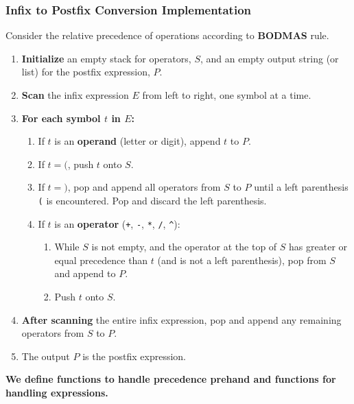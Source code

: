 
\subsubsection{Infix to Postfix Conversion Implementation}
Consider the relative precedence of operations according to \textbf{BODMAS}
rule. 

\begin{enumerate}
  \item \textbf{Initialize} an empty stack for operators, \( S \), and an empty output string (or list) for the postfix expression, \( P \).
  \item \textbf{Scan} the infix expression \( E \) from left to right, one symbol at a time.
  \item \textbf{For each symbol \( t \) in \( E \):}
    \begin{enumerate}[label=\alph*)]
      \item If \( t \) is an \textbf{operand} (letter or digit), append \( t \) to \( P \).
      \item If \( t = \texttt{(} \), push \( t \) onto \( S \).
      \item If \( t = \texttt{)} \), pop and append all operators from \( S \) to \( P \) until a left parenthesis \texttt{(} is encountered. Pop and discard the left parenthesis.
      \item If \( t \) is an \textbf{operator} (\texttt{+}, \texttt{-}, \texttt{*}, \texttt{/}, \texttt{\^{}}):
        \begin{enumerate}[label=\roman*)]
          \item While \( S \) is not empty, and the operator at the top of \( S \) has greater or equal precedence than \( t \) (and is not a left parenthesis), pop from \( S \) and append to \( P \).
          \item Push \( t \) onto \( S \).
        \end{enumerate}
    \end{enumerate}
  \item \textbf{After scanning} the entire infix expression, pop and append any remaining operators from \( S \) to \( P \).
  \item The output \( P \) is the postfix expression.
\end{enumerate}

\textbf{We define functions to handle precedence prehand and functions for handling expressions.}

